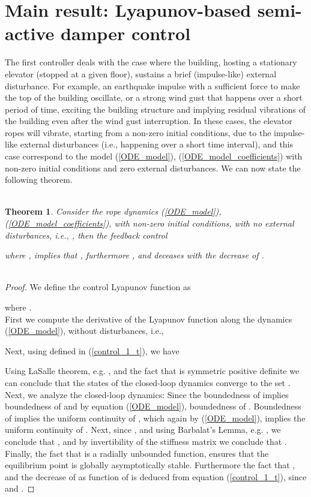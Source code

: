 \documentclass[letterpaper, 11 pt, conference]{ieeeconf}
\newtheorem{thm}{\bf Theorem}
\begin{document}
\section{Main result: Lyapunov-based semi-active damper control}\label{section2}
The first controller deals with the case where the building,
hosting a stationary elevator (stopped at a given floor), sustains
a brief (impulse-like) external disturbance. For example, an
earthquake impulse with a sufficient force to make the top of the
building oscillate, or a strong wind gust that happens over a
short period of time, exciting the building structure and implying
residual vibrations of the building even after the wind gust
interruption. In these cases, the elevator ropes will vibrate,
starting from a non-zero initial conditions, due to the
impulse-like external disturbances (i.e., happening over a short
time interval), and this case correspond to the model
(\ref{ODE_model}), (\ref{ODE_model_coefficients}) with non-zero
initial conditions and zero external disturbances. We can now
state the following
theorem.\\\\
 \begin{thm}
Consider the rope dynamics (\ref{ODE_model}),
(\ref{ODE_model_coefficients}), with non-zero initial conditions,
with no external disturbances, i.e., , then the feedback control

where , implies that , furthermore , and  deceases with the decrease of .\\\\
\end{thm}
\begin{proof}
 We define the control Lyapunov function  as

where .\\
 First we compute the derivative of the Lyapunov function
along the dynamics  (\ref{ODE_model}), without disturbances, i.e.,


Next, using  defined in (\ref{control_1_t}), we have

Using LaSalle theorem, e.g. \cite{K96}, and the fact that
 is symmetric positive definite we can conclude that
the states of the closed-loop dynamics converge to the set
.
Next, we analyze the closed-loop dynamics: Since the boundedness
of  implies boundedness of  and by equation
(\ref{ODE_model}), boundedness of . Boundedness of
 implies the uniform continuity of
, which again by (\ref{ODE_model}), implies the
uniform continuity of . Next, since , and using Barbalat's Lemma, e.g. \cite{K96}, we conclude that
, and by invertibility of the stiffness
matrix  we conclude that . Finally, the
fact that  is a radially unbounded function, ensures that the
equilibrium point  is globally asymptotically
stable. Furthermore the fact that , and the
decrease of  as function of  is
deduced from equation (\ref{control_1_t}), since
 and
.
\end{proof}
\end{document}

